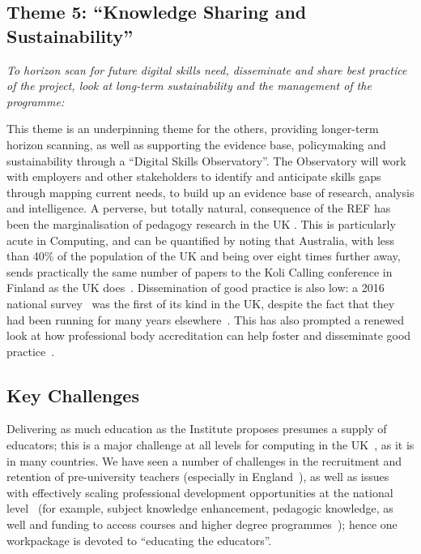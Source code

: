 \documentclass[conference]{IEEEtran}
\begin{document}
\subsection{Theme 5: ``Knowledge Sharing and Sustainability''}

{\emph{To horizon scan for future digital skills need, disseminate and
share best practice of the project, look at long-term sustainability
and the management of the programme:}}\newline

\noindent This theme is an underpinning theme for the others,
providing longer-term horizon scanning, as well as supporting the
evidence base, policymaking and sustainability through a ``Digital
Skills Observatory''. The Observatory will work with employers and
other stakeholders to identify and anticipate skills gaps through
mapping current needs, to build up an evidence base of research,
analysis and intelligence.  A perverse, but totally natural,
consequence of the REF has been the marginalisation of pedagogy
research in the UK \cite{Cottonetal2018a}. This is particularly acute
in Computing, and can be quantified by noting that Australia, with
less than 40\% of the population of the UK and being over eight times further away, sends practically the same
number of papers to the Koli Calling conference in Finland as the UK
does~\cite{Simon2016a}. Dissemination of good practice is also low: a
2016 national survey~\cite{murphy-et-al:programming2017} was the first
of its kind in the UK, despite the fact that they had been running for
many years elsewhere~\cite{simon-et-al:sigcse2018}. This has also
prompted a renewed look at how professional body accreditation can help
foster and disseminate good practice~\cite{crick-et-al:cep2020}.

\subsection{Key Challenges}

Delivering as much education as the Institute proposes presumes a
supply of educators; this is a major challenge at all levels for
computing in the UK~\cite{brown-et-al:toce2014}, as it is in many
countries. We have seen a number of challenges in the recruitment and
retention of pre-university teachers (especially in
England~\cite{sentance+waite:2018}), as well as issues with
effectively scaling professional development opportunities at the
national level~\cite{sentance+csizmadia:2017} (for example, subject
knowledge enhancement, pedagogic knowledge, as well and funding to
access courses and higher degree
programmes~\cite{sentance-et-al-wipsce2012,moller+crick:jce2018});
hence one workpackage is devoted to ``educating the educators''.
\end{document}
